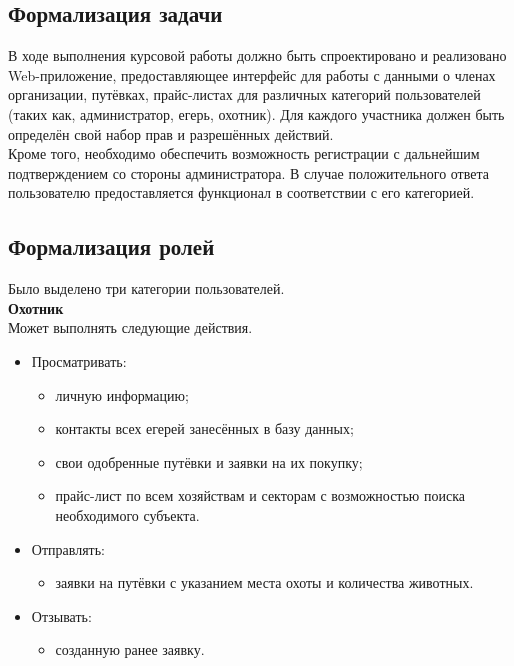 	\subsection{Формализация задачи}
	В ходе выполнения курсовой работы должно быть спроектировано и реализовано Web-приложение, предоставляющее интерфейс для работы с данными о членах организации, путёвках, прайс-листах для различных категорий пользователей (таких как, администратор, егерь, охотник). Для каждого участника должен быть определён свой набор прав и разрешённых действий.\\
	
	Кроме того, необходимо обеспечить возможность регистрации с дальнейшим подтверждением со стороны администратора. В случае положительного ответа пользователю предоставляется функционал в соответствии с его категорией.
	
	\subsection{Формализация ролей}
	Было выделено три категории пользователей.\\
	
	\textbf{Охотник} \\
		Может выполнять следующие действия.
		\begin{itemize}
			\item Просматривать:
			\begin{itemize}
				\item личную информацию;
				\item контакты всех егерей занесённых в базу данных;
				\item свои одобренные путёвки и заявки на их покупку;
				\item прайс-лист по всем хозяйствам и секторам с возможностью поиска необходимого субъекта.
			\end{itemize}
			\item Отправлять:
			\begin{itemize} 
			 	\item заявки на путёвки с указанием места охоты и количества животных.
			\end{itemize}
		 	\item Отзывать:
		 	\begin{itemize}
		 		\item созданную ранее заявку.
		 	\end{itemize}
		\end{itemize}
	
